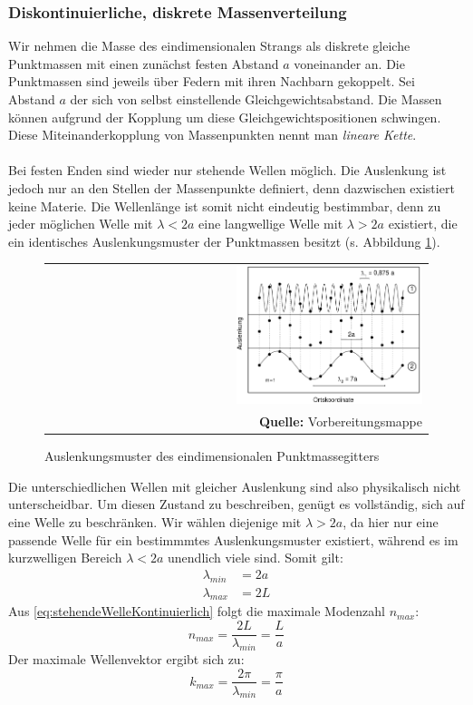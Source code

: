 \documentclass[a4paper,titlepage]{scrartcl}
\numberwithin{equation}{section}
\begin{document}
\subsubsection{Diskontinuierliche, diskrete Massenverteilung}
Wir nehmen die Masse des eindimensionalen Strangs als diskrete gleiche Punktmassen mit einen zunächst festen Abstand $a$ voneinander an. Die Punktmassen sind jeweils über Federn mit ihren Nachbarn gekoppelt. Sei Abstand $a$ der sich von selbst einstellende Gleichgewichtsabstand. Die Massen können aufgrund der Kopplung um diese Gleichgewichtspositionen schwingen. Diese Miteinanderkopplung von Massenpunkten nennt man \emph{lineare Kette}.\\ \\
Bei festen Enden sind wieder nur stehende Wellen möglich. Die Auslenkung ist jedoch nur an den Stellen der Massenpunkte definiert, denn dazwischen existiert keine Materie. Die Wellenlänge ist somit nicht eindeutig bestimmbar, denn zu jeder möglichen Welle mit $\lambda < 2a$ eine langwellige Welle mit $\lambda > 2a$ existiert, die ein identisches Auslenkungsmuster der Punktmassen besitzt (s. Abbildung \ref{fig:diskreteStehendeWelle}).
\begin{figure}[H]
	\centering
	\begin{tabular}{@{}r@{}}
		\includegraphics[width=0.5\textwidth]{images/stehendewellediskret.png}\\
		\footnotesize\sffamily\textbf{Quelle:} Vorbereitungsmappe \cite{vorbereitungsmappe}
	\end{tabular}
	\caption{Auslenkungsmuster des eindimensionalen Punktmassegitters}
    \label{fig:diskreteStehendeWelle}
\end{figure}
Die unterschiedlichen Wellen mit gleicher Auslenkung sind also physikalisch nicht unterscheidbar. Um diesen Zustand zu beschreiben, genügt es vollständig, sich auf eine Welle zu beschränken. Wir wählen diejenige mit $\lambda > 2a$, da hier nur eine passende Welle für ein bestimmmtes Auslenkungsmuster existiert, während es im kurzwelligen Bereich $\lambda < 2a$ unendlich viele sind. Somit gilt:
\begin{align*}
\lambda_{min}&=2a\\
\lambda_{max}&=2L
\end{align*}
Aus \ref{eq:stehendeWelleKontinuierlich} folgt die maximale Modenzahl $n_{max}$:
\begin{equation*}
n_{max}=\frac{2L}{\lambda_{min}}=\frac{L}{a}
\end{equation*}
Der maximale Wellenvektor ergibt sich zu:
\begin{equation*}
k_{max}=\frac{2 \pi}{\lambda_{min}}=\frac{\pi}{a}
\end{equation*}
\end{document}
